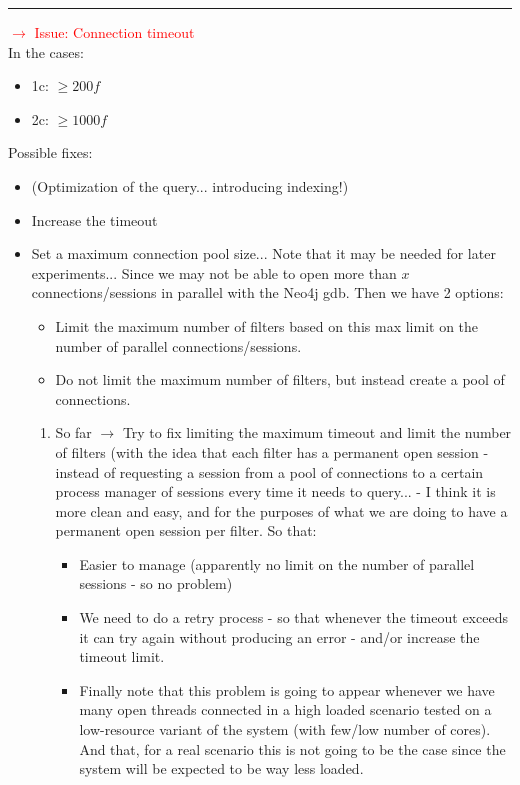 \rule{\textwidth}{0.4pt} 
\textcolor{red}{$\rightarrow$ Issue: Connection timeout\\}
In the cases: 
\begin{itemize}
    \item 1c: $\ge 200f$
    \item 2c: $\ge 1000f$
\end{itemize}

Possible fixes:
\begin{itemize}
    \item (Optimization of the query... introducing indexing!)
    \item Increase the timeout
    \item Set a maximum connection pool size... Note that it may be needed for later experiments...
    Since we may not be able to open more than $x$ connections/sessions in parallel with the Neo4j gdb. Then we have 2 options:
    \begin{itemize}
        \item Limit the maximum number of filters based on this max limit on the number of parallel connections/sessions.
        \item Do not limit the maximum number of filters, but instead create a pool of connections.
    \end{itemize}
    \begin{enumerate}
        \item So far $\rightarrow$ Try to fix limiting the maximum timeout and limit the number of filters (with the idea that each filter has a permanent open session - instead of requesting a session from a pool of connections to a certain process manager of sessions every time it needs to query... - I think it is more clean and easy, and for the purposes of what we are doing to have a permanent open session per filter. So that:
        \begin{itemize}
            \item Easier to manage (apparently no limit on the number of parallel sessions - so no problem)
            \item We need to do a retry process - so that whenever the timeout exceeds it can try again without producing an error - and/or increase the timeout limit.
            \item Finally note that this problem is going to appear whenever we have many open threads connected in a high loaded scenario tested on a low-resource variant of the system (with few/low number of cores). And that, for a real scenario this is not going to be the case since the system will be expected to be way less loaded.
        \end{itemize}
    \end{enumerate}
\end{itemize}

